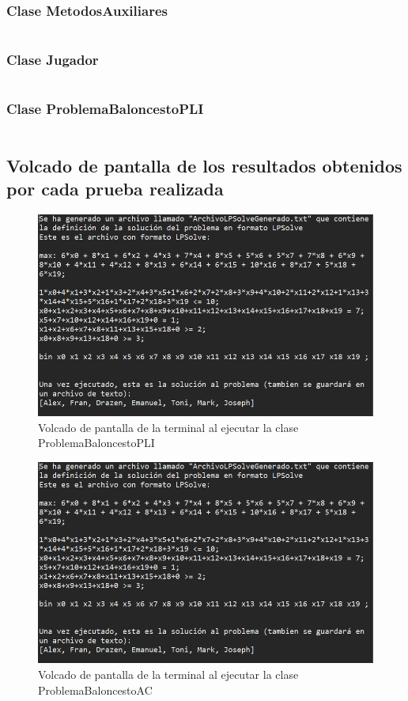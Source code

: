 \documentclass[a4paper,12pt]{article}
\begin{document}
\subsubsection{Clase MetodosAuxiliares}
\inputminted[fontsize=\footnotesize,breaklines]{java}{src/andalu30/PracticaIndividual1/MetodosAuxiliares.java}

\subsubsection{Clase Jugador}
\inputminted[fontsize=\footnotesize,breaklines]{java}{src/andalu30/PracticaIndividual1/Jugador.java}

\subsubsection{Clase ProblemaBaloncestoPLI}
\inputminted[fontsize=\footnotesize,breaklines]{java}{src/andalu30/PracticaIndividual1/ProblemaBaloncestoPLI.java}


\subsection{Volcado de pantalla de los resultados obtenidos por cada prueba realizada}

\begin{figure}[h]
  \includegraphics{AlgoritmoPLI.PNG}
  \caption{Volcado de pantalla de la terminal al ejecutar la clase ProblemaBaloncestoPLI}
  \label{fig:pli}
\end{figure}

\begin{figure}[h]
  \includegraphics{AlgoritmoPLI.PNG}
  \caption{Volcado de pantalla de la terminal al ejecutar la clase ProblemaBaloncestoAC}
  \label{fig:ag}
\end{figure}
\end{document}
